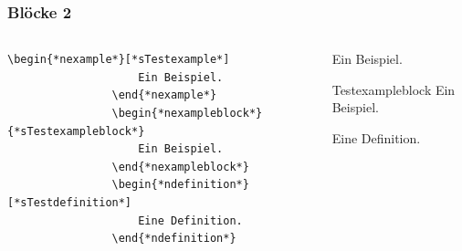 \documentclass[german,notoc]{tudbeamer}%
\begin{document}
\begin{frame}[fragile]
	\frametitle{Blöcke 2}

	\begin{columns}[T,onlytextwidth]
		\begin{column}[T]{.475\textwidth}
			\begin{lstlisting}[gobble=8,style=latex]
				\begin{*nexample*}[*sTestexample*]
					Ein Beispiel.
				\end{*nexample*}
				\begin{*nexampleblock*}{*sTestexampleblock*}
					Ein Beispiel.
				\end{*nexampleblock*}
				\begin{*ndefinition*}[*sTestdefinition*]
					Eine Definition.
				\end{*ndefinition*}
			\end{lstlisting} 
		\end{column}
		\begin{column}[T]{.475\textwidth}
			\begin{example}[Testexample]
				Ein Beispiel.
			\end{example}
			\begin{exampleblock}{Testexampleblock}
				Ein Beispiel.
			\end{exampleblock}
			\begin{definition}[Testdefinition]
				Eine Definition.
			\end{definition}
		\end{column}
	\end{columns}
\end{frame}
\end{document}
